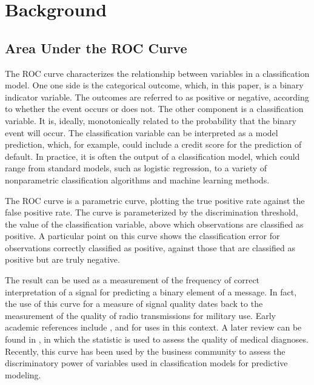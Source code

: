 



\section{Background}
\subsection{Area Under the ROC Curve}


The ROC curve characterizes the relationship between variables in a classification model.
One one side is the categorical outcome, which, in this paper, is a binary indicator variable.
The outcomes are referred to as positive or negative, according to whether the event occurs or does not.
The other component is a classification variable.
It is, ideally, monotonically related to the probability that the binary event will occur.
The classification variable can be interpreted as a model prediction, which, for example, could include a credit score for the prediction of default.
In practice, it is often the output of a classification model, which could range from standard models, such as logistic regression, to a variety of nonparametric classification algorithms and machine learning methods.

The ROC curve is a parametric curve, plotting the true positive rate against the false positive rate.
The curve is parameterized by the discrimination threshold, the value of the classification variable, above which observations are classified as positive.
A particular point on this curve shows the classification error for observations correctly classified as positive, against those that are classified as positive but are truly negative.

The result can be used as a measurement of the frequency of correct interpretation of a signal for predicting a binary element of a message.
In fact, the use of this curve for a measure of signal quality dates back to
the measurement of
the quality of radio transmissions for military use.
Early academic references include \citet{peterson1954}, \citet{vanmeter1954} and \citet{wald1949} for uses in this context.
A later review can be found in \citet{hanley1989}, in which the statistic is used to assess the quality of medical diagnoses.
Recently, this curve has been used by the business community to assess the discriminatory power of variables used in classification models for predictive modeling.


